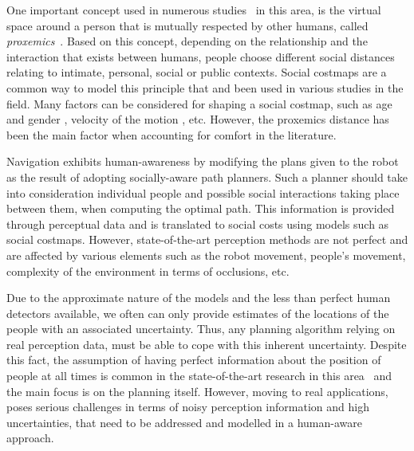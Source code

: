 
One important concept used in numerous studies~\cite{Mumm2011,Takayama2009,Walters2011,ferrer2013robot} in this area, is the virtual space around a person that is mutually respected by other humans, called \textit{proxemics}~\cite{Hall1969}.
Based on this concept, depending on the relationship and the interaction that exists between humans, people choose different social distances relating to intimate, personal, social or public contexts.
Social costmaps are a common way to model this principle that and been used in various studies in the field. %
Many factors can be considered for shaping a social costmap, such as age and gender \cite{dautenhahn2006may}, velocity of the motion \cite{kirby2009companion}, etc. However, the proxemics distance has been the main factor when accounting for comfort in the literature.%

Navigation exhibits human-awareness by modifying the plans given to the robot as the result of adopting socially-aware path planners.
Such a planner should take into consideration individual people and possible social interactions taking place between them, when computing the optimal path. This information is provided through perceptual data and is translated to social costs using models such as social costmaps. However, state-of-the-art perception methods are not perfect and are affected by various elements such as the robot movement, people's movement, complexity of the environment in terms of occlusions, etc. 


Due to the approximate nature of the models and the less than perfect human detectors available, we often can only provide estimates of the locations of the people with an associated uncertainty. Thus, any planning algorithm relying on real perception data, must be able to cope with this inherent uncertainty. Despite this fact, the assumption of having perfect information about the position of people at all times is common in the state-of-the-art research in this area%
~and the main focus is on the planning itself. However, moving to real applications, poses serious challenges in terms of noisy perception information and high uncertainties, that need to be addressed and modelled in a human-aware approach.


